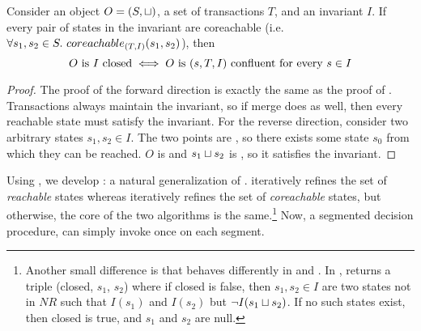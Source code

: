 \begin{theorem}
  Consider an object $O = (S, \sqcup)$, a set of transactions $T$, and an
  invariant $I$. If every pair of states in the invariant are coreachable (i.e.
  $\forall s_1, s_2 \in S.\ \TIcoreachablepredicate{s_1, s_2}$), then
  \[
    \text{$O$ is $I$ closed{}}
    \iff
    \text{$O$ is $(s, T, I)$ confluent for every $s \in I$}
  \]
\end{theorem}
\begin{proof}
  The proof of the forward direction is exactly the same as the proof of
  . Transactions always maintain the
  invariant, so if merge does as well, then every reachable state must satisfy
  the invariant.
  For the reverse direction, consider two arbitrary states $s_1, s_2 \in I$.
  The two points are \TIcoreachable{}, so there exists some state $s_0$ from
  which they can be reached. $O$ is \sTIconfluent{} and $s_1 \sqcup s_2$ is
  \sTIreachable{}, so it satisfies the invariant.
\end{proof}

Using , we develop
: a natural generalization
of .
 iteratively refines the set of
\emph{reachable} states whereas
 iteratively refines the
set of \emph{coreachable} states, but otherwise, the core of the two algorithms
is the same.\footnote{%
  Another small difference is that \IsIclosed{} behaves differently in
   and
  . In
  , \IsIclosed{} returns a
  triple (closed, $s_1$, $s_2$) where if closed is false, then $s_1, s_2 \in I$
  are two states not in $NR$ such that $I(s_1)$ and $I(s_2)$ but $\lnot I(s_1
  \sqcup s_2)$. If no such states exist, then closed is true, and $s_1$ and
  $s_2$ are null.
}
Now, a segmented \invariantconfluence{} decision procedure, can simply invoke
 once on each segment.


